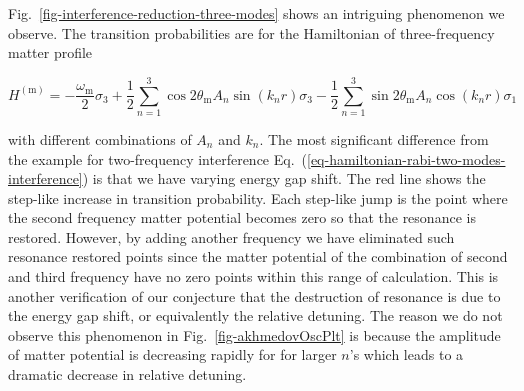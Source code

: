 \documentclass[%
reprint,
 amsmath,amssymb,
 aps,
]{revtex4-1}
\begin{document}
Fig.~\ref{fig-interference-reduction-three-modes} shows an intriguing phenomenon we observe. The transition probabilities are for the Hamiltonian of three-frequency matter profile
\begin{widetext}
\begin{equation}
H^{(\mathrm m)} =  -\frac{\omega_{\mathrm{m}}}{2} \sigma_3 + \frac{1}{2} \sum_{n=1}^3 \cos 2\theta_{\mathrm m} A_n \sin (k_n r) \sigma_3  - \frac{1}{2} \sum_{n=1}^3 \sin 2\theta_{\mathrm m} A_n \cos (k_n r) \sigma_1 
\label{eq-hamiltonian-rabi-three-frequency-interference}
\end{equation}
\end{widetext}
with different combinations of $A_n$ and $k_n$. The most significant difference from the example for two-frequency interference Eq.~(\ref{eq-hamiltonian-rabi-two-modes-interference}) is that we have varying energy gap shift. The red line shows the step-like increase in transition probability. Each step-like jump is the point where the second frequency matter potential becomes zero so that the resonance is restored. However, by adding another frequency we have eliminated such resonance restored points since the matter potential of the combination of second and third frequency have no zero points within this range of calculation. This is another verification of our conjecture that the destruction of resonance is due to the energy gap shift, or equivalently the relative detuning. The reason we do not observe this phenomenon in Fig.~\ref{fig-akhmedovOscPlt} is because the amplitude of matter potential is decreasing rapidly for for larger $n$'s which leads to a dramatic decrease in relative detuning.
\end{document}
